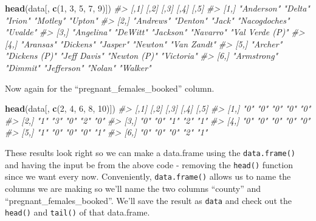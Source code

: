 \documentclass[
  12pt,
]{book}
\newenvironment{Shaded}{\begin{snugshade}}{\end{snugshade}}
\newcommand{\CommentTok}[1]{\textcolor[rgb]{0.37,0.37,0.37}{\textit{#1}}}
\newcommand{\DecValTok}[1]{\textcolor[rgb]{0.06,0.06,0.06}{#1}}
\newcommand{\KeywordTok}[1]{\textcolor[rgb]{0.27,0.27,0.27}{\textbf{#1}}}
\newcommand{\NormalTok}[1]{#1}
\begin{document}
\begin{Shaded}
\begin{Highlighting}[]
\KeywordTok{head}\NormalTok{(data[, }\KeywordTok{c}\NormalTok{(}\DecValTok{1}\NormalTok{, }\DecValTok{3}\NormalTok{, }\DecValTok{5}\NormalTok{, }\DecValTok{7}\NormalTok{, }\DecValTok{9}\NormalTok{)])}
\CommentTok{\#>      [,1]        [,2]          [,3]         [,4]          [,5]           }
\CommentTok{\#> [1,] "Anderson"  "Delta"       "Irion"      "Motley"      "Upton"        }
\CommentTok{\#> [2,] "Andrews"   "Denton"      "Jack"       "Nacogdoches" "Uvalde"       }
\CommentTok{\#> [3,] "Angelina"  "DeWitt"      "Jackson"    "Navarro"     "Val Verde (P)"}
\CommentTok{\#> [4,] "Aransas"   "Dickens"     "Jasper"     "Newton"      "Van Zandt"    }
\CommentTok{\#> [5,] "Archer"    "Dickens (P)" "Jeff Davis" "Newton (P)"  "Victoria"     }
\CommentTok{\#> [6,] "Armstrong" "Dimmit"      "Jefferson"  "Nolan"       "Walker"}
\end{Highlighting}
\end{Shaded}

Now again for the ``pregnant\_females\_booked'' column.

\begin{Shaded}
\begin{Highlighting}[]
\KeywordTok{head}\NormalTok{(data[, }\KeywordTok{c}\NormalTok{(}\DecValTok{2}\NormalTok{, }\DecValTok{4}\NormalTok{, }\DecValTok{6}\NormalTok{, }\DecValTok{8}\NormalTok{, }\DecValTok{10}\NormalTok{)])}
\CommentTok{\#>      [,1] [,2] [,3] [,4] [,5]}
\CommentTok{\#> [1,] "0"  "0"  "0"  "0"  "0" }
\CommentTok{\#> [2,] "1"  "3"  "0"  "2"  "0" }
\CommentTok{\#> [3,] "0"  "0"  "1"  "2"  "1" }
\CommentTok{\#> [4,] "0"  "0"  "0"  "0"  "0" }
\CommentTok{\#> [5,] "1"  "0"  "0"  "0"  "1" }
\CommentTok{\#> [6,] "0"  "0"  "0"  "2"  "1"}
\end{Highlighting}
\end{Shaded}

These results look right so we can make a data.frame using the \texttt{data.frame()} and having the input be from the above code - removing the \texttt{head()} function since we want every now. Conveniently, \texttt{data.frame()} allows us to name the columns we are making so we'll name the two columns ``county'' and ``pregnant\_females\_booked''. We'll save the result as \texttt{data} and check out the \texttt{head()} and \texttt{tail()} of that data.frame.
\end{document}
